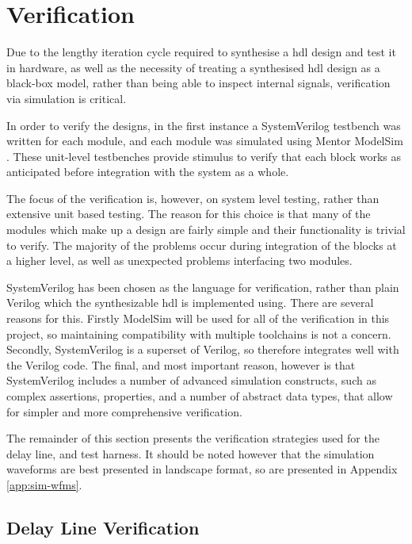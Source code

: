 \section{ Verification} \label{sec:hdl-verif}
Due to the lengthy iteration cycle required to synthesise a \gls{hdl} design and test it in hardware, as well as the necessity of treating a synthesised \gls{hdl} design as a black-box model, rather than being able to inspect internal signals, verification via simulation is critical.

In order to verify the designs, in the first instance a SystemVerilog testbench was written for each module, and each module was simulated using Mentor ModelSim \cite{mentor2017}. These unit-level testbenches provide stimulus to verify that each block works as anticipated before integration with the system as a whole.

The focus of the verification is, however, on system level testing, rather than extensive unit based testing. The reason for this choice is that many of the modules which make up a design are fairly simple and their functionality is trivial to verify. The majority of the problems occur during integration of the blocks at a higher level, as well as unexpected problems interfacing two modules.

SystemVerilog has been chosen as the language for verification, rather than plain Verilog which the synthesizable \gls{hdl} is implemented using. There are several reasons for this. Firstly ModelSim will be used for all of the verification in this project, so maintaining compatibility with multiple toolchains is not a concern. Secondly, SystemVerilog is a superset of Verilog, so therefore integrates well with the Verilog code. The final, and most important reason, however is that SystemVerilog includes a number of advanced simulation constructs, such as complex assertions, properties, and a number of abstract data types, that allow for simpler and more comprehensive verification.

The remainder of this section presents the verification strategies used for the delay line, and test harness. It should be noted however that the simulation waveforms are best presented in landscape format, so are presented in Appendix \ref{app:sim-wfms}.

\subsection{Delay Line Verification}

